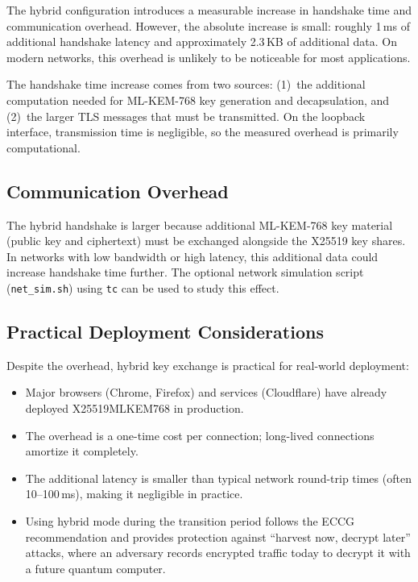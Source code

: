 \documentclass[11pt,a4paper]{article}
\begin{document}
The hybrid configuration introduces a measurable increase in handshake time and communication overhead. However, the absolute increase is small: roughly 1\,ms of additional handshake latency and approximately 2.3\,KB of additional data. On modern networks, this overhead is unlikely to be noticeable for most applications.

The handshake time increase comes from two sources: (1)~the additional computation needed for ML-KEM-768 key generation and decapsulation, and (2)~the larger TLS messages that must be transmitted. On the loopback interface, transmission time is negligible, so the measured overhead is primarily computational.

\subsection{Communication Overhead}

The hybrid handshake is larger because additional ML-KEM-768 key material (public key and ciphertext) must be exchanged alongside the X25519 key shares. In networks with low bandwidth or high latency, this additional data could increase handshake time further. The optional network simulation script (\texttt{net\_sim.sh}) using \texttt{tc} can be used to study this effect.

\subsection{Practical Deployment Considerations}

Despite the overhead, hybrid key exchange is practical for real-world deployment:

\begin{itemize}
    \item Major browsers (Chrome, Firefox) and services (Cloudflare) have already deployed X25519MLKEM768 in production.
    \item The overhead is a one-time cost per connection; long-lived connections amortize it completely.
    \item The additional latency is smaller than typical network round-trip times (often 10--100\,ms), making it negligible in practice.
    \item Using hybrid mode during the transition period follows the ECCG recommendation and provides protection against ``harvest now, decrypt later'' attacks, where an adversary records encrypted traffic today to decrypt it with a future quantum computer.
\end{itemize}
\end{document}
